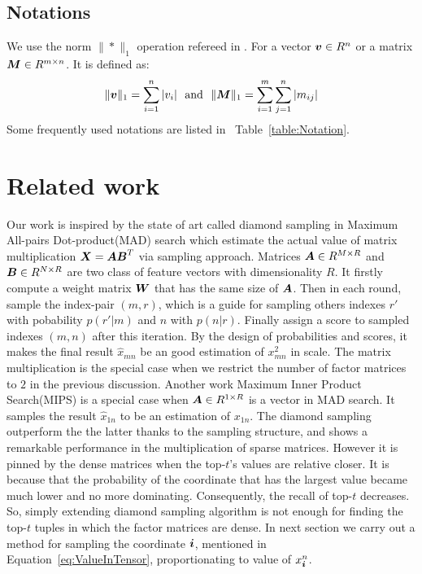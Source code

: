 \documentclass[letterpaper]{article}
\newcommand{\V}[1]{{\bm{{\MakeLowercase{#1}}}}}
\newcommand{\M}[1]{{\bm{{\MakeUppercase{#1}}}}}
\newcommand{\norm}[2]{\|#1\|_{#2}}
\newcommand{\Eqn}[1]   {Equation~\ref{eq:#1}}
\newcommand{\Table}[1] {Table~\ref{table:#1}}
\begin{document}
\subsection{Notations}

We use the norm $\norm{*}{1}$ operation refereed in \cite{BaPiKoSe15}.
For a vector $\V{v}\in R^n$ or a matrix $\M{M}\in R^{m\times n}$.
It is defined as:
\[
    \norm{\V{v}}{1} = \sum_{i=1}^{n}|v_i|
    \ \  {\rm and} \ \
    \norm{\M{M}}{1} = \sum_{i=1}^{m}\sum_{j=1}^{n}|m_{ij}|
\]
Some frequently used notations are listed in ~\Table{Notation}.


\section{Related work}
Our work is inspired by the state of art called diamond sampling
in Maximum All-pairs Dot-product(MAD) search\cite{BaPiKoSe15}
which estimate the actual value of matrix multiplication
$\M{X} = \M{A}\M{B}^T$ via sampling approach.
Matrices $\M{A}\in R^{M\times R}$ and $\M{B}\in R^{N\times R}$ 
are two class of feature vectors with dimensionality $R$.
It firstly compute a weight matrix $\M{W}$ that has the same size of $\M{A}$.
Then in each round, sample the index-pair $(m,r)$,
which is a guide for sampling others indexes $r'$ with pobability
$p(r'|m)$ and $n$ with $p(n|r)$.
Finally assign a score to sampled indexes ${(m,n)}$ after this iteration.
By the design of probabilities and scores,
it makes the final result $\widehat{x}_{mn}$ be an good estimation of $x^2_{mn}$ in scale.
The matrix multiplication is the special case
when we restrict the number of factor matrices to $2$ in the previous discussion.
Another work Maximum Inner Product Search(MIPS)\cite{Cohen97}
is a special case when $\M{A}\in R^{1\times R}$ is a vector in MAD search.
It samples the result $\widehat{x}_{1n}$ to be an estimation of $x_{1n}$.
The diamond sampling outperform the the latter thanks to the sampling structure,
and shows a remarkable performance in the multiplication of sparse matrices.
However it is pinned by the dense matrices when the top-$t$'s values are relative closer.
It is because that the probability of the coordinate that has the largest value became much lower
and no more dominating.
Consequently, the recall of top-$t$ decreases.
So, simply extending diamond sampling algorithm is not enough 
for finding the top-$t$ tuples in which the factor matrices are dense.
In next section we carry out a method for sampling the coordinate $\V{i}$,
mentioned in \Eqn{ValueInTensor},
proportionating to value of $x^n_{\V{i}}$.
\end{document}
